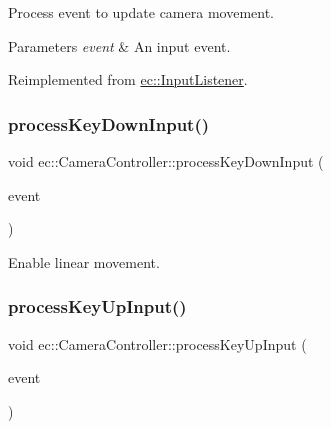 Process event to update camera movement. 


\begin{DoxyParams}{Parameters}
{\em event} & An input event. \\
\hline
\end{DoxyParams}


Reimplemented from \mbox{\hyperlink{classec_1_1_input_listener_a9ceaefc79c6b0b260e88454616137840}{ec\+::\+Input\+Listener}}.

\mbox{\label{classec_1_1_camera_controller_af1e6f226b4af2aa815bd885f71d25c12}} 
\subsubsection{\texorpdfstring{process\+Key\+Down\+Input()}{processKeyDownInput()}}
{\footnotesize\ttfamily void ec\+::\+Camera\+Controller\+::process\+Key\+Down\+Input (\begin{DoxyParamCaption}\item[{const \mbox{\hyperlink{structec_1_1_keyboard_event}{Keyboard\+Event}} \&}]{event }\end{DoxyParamCaption})\hspace{0.3cm}{\ttfamily [protected]}}



Enable linear movement. 

\mbox{\label{classec_1_1_camera_controller_ac92bb03a95ddf600b4a08b5b043b601e}} 
\subsubsection{\texorpdfstring{process\+Key\+Up\+Input()}{processKeyUpInput()}}
{\footnotesize\ttfamily void ec\+::\+Camera\+Controller\+::process\+Key\+Up\+Input (\begin{DoxyParamCaption}\item[{const \mbox{\hyperlink{structec_1_1_keyboard_event}{Keyboard\+Event}} \&}]{event }\end{DoxyParamCaption})\hspace{0.3cm}{\ttfamily [protected]}}



